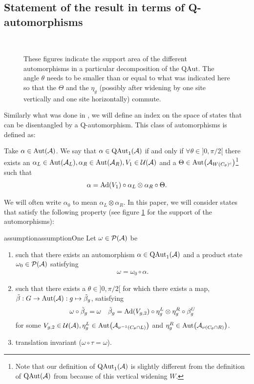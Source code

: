 \documentclass[11pt,a4paper,twoside]{article}
\numberwithin{equation}{section}
\begin{document}
	\subsection{Statement of the result in terms of Q-automorphisms}\label{sec:Results_2}
	\begin{figure}
		\centering
		\def\s{0.5}
		\resizebox{0.35\textwidth}{!}{%
			}
		$\qquad$
		\def\s{0.4}
		\resizebox{0.42\textwidth}{!}{%
			}
		\caption{These figures indicate the support area of the different automorphisms in a particular decomposition of the $\textrm{QAut}$. The angle $\theta$ needs to be smaller than or equal to what was indicated here so that the $\Theta$ and the $\eta_g$ (possibly after widening by one site vertically and one site horizontally) commute.}
		\label{fig:SetupWithQAutomorphism}
	\end{figure}
	Similarly what was done in \cite{ogata2021h3gmathbb}, we will define an index on the space of states that can be disentangled by a Q-automorphism. This class of automorphisms is defined as:
	\begin{definition}\label{def:QAut}
		Take $\alpha\in\Aut{\AA}$. We say that $\alpha\in\QAut{\AA}$ if and only if $\forall\theta\in]0,\pi/2[$ there exists an $\alpha_L\in\Aut{\AA_L},\alpha_R\in\Aut{\AA_R},V_1\in\UU(\AA)$ and a $\Theta\in\Aut{\AA_{W(C_\theta)^c}}$\footnote{Note that our definition of $\QAut{\AA}$ is slightly different from the definition of $\textrm{QAut}(\AA)$ from \cite{ogata2021h3gmathbb} because of this vertical widening $W$.} such that
		\begin{equation}
			\alpha=\Ad{V_1}\circ\alpha_L\otimes\alpha_R\circ\Theta.
		\end{equation}
	\end{definition}
	We will often write $\alpha_0$ to mean $\alpha_L\otimes\alpha_R$. In this paper, we will consider states that satisfy the following property (see figure \ref{fig:SetupWithQAutomorphism} for the support of the automorphisms):
	\begin{restatable}{assumption}{assumptionOne}\label{assumption}
		Let $\omega\in\PP(\AA)$ be
		\begin{enumerate}
			\item such that there exists an automorphism $\alpha\in\QAut{\AA}$ and a product state $\omega_0\in\PP(\AA)$ satisfying
			\begin{align}
				\omega=\omega_0\circ\alpha.
			\end{align}
			\item such that there exists a $\theta\in]0,\pi/2[$ for which there exists a map, $\tilde\beta:G\rightarrow\Aut{\AA}:g\mapsto\tilde\beta_g$, satisfying
			\begin{align}
				\omega\circ\tilde\beta_g&=\omega&\tilde\beta_g=\Ad{V_{g,2}}\circ\eta^L_g\otimes\eta^R_g\circ\beta^U_g
			\end{align}
			for some $V_{g,2}\in\UU(\AA),\eta^L_g\in\Aut{\AA_{\nu^{-1}(C_\theta\cap L)}}$ and $\eta^R_g\in\Aut{\AA_{\nu(C_\theta\cap R)}}$.
			\item translation invariant ($\omega\circ\tau=\omega$).
		\end{enumerate}
	\end{restatable}
\end{document}
